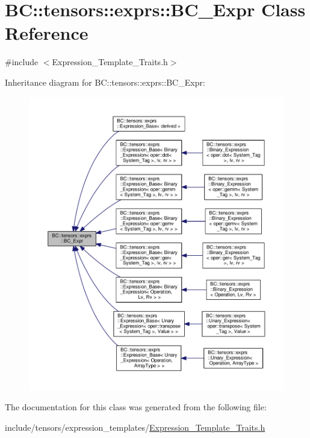 \hypertarget{classBC_1_1tensors_1_1exprs_1_1BC__Expr}{}\section{BC\+:\+:tensors\+:\+:exprs\+:\+:B\+C\+\_\+\+Expr Class Reference}
\label{classBC_1_1tensors_1_1exprs_1_1BC__Expr}


{\ttfamily \#include $<$Expression\+\_\+\+Template\+\_\+\+Traits.\+h$>$}



Inheritance diagram for BC\+:\+:tensors\+:\+:exprs\+:\+:B\+C\+\_\+\+Expr\+:
\nopagebreak
\begin{figure}[H]
\begin{center}
\leavevmode
\includegraphics[width=350pt]{classBC_1_1tensors_1_1exprs_1_1BC__Expr__inherit__graph}
\end{center}
\end{figure}


The documentation for this class was generated from the following file\+:\begin{DoxyCompactItemize}
\item 
include/tensors/expression\+\_\+templates/\hyperlink{Expression__Template__Traits_8h}{Expression\+\_\+\+Template\+\_\+\+Traits.\+h}\end{DoxyCompactItemize}
